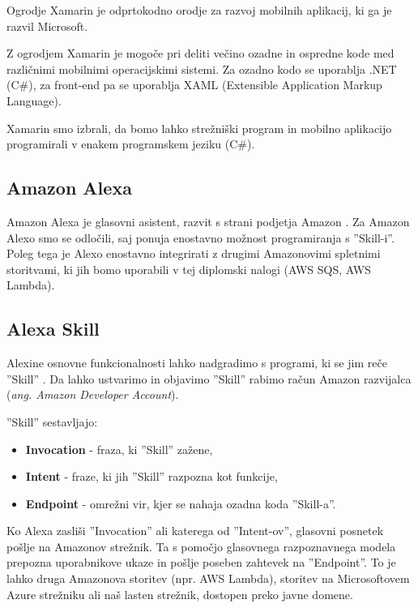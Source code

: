 \documentclass[a4paper, 12pt]{book}
\begin{document}
Ogrodje Xamarin \cite{xamarin} je odprtokodno orodje za razvoj mobilnih aplikacij, ki ga je razvil Microsoft. 

Z ogrodjem Xamarin je mogoče pri deliti večino ozadne in ospredne kode med različnimi mobilnimi operacijskimi sistemi. 
Za ozadno kodo se uporablja .NET (C\#), za front-end pa se uporablja XAML (Extensible Application Markup Language).

Xamarin smo izbrali, da bomo lahko strežniški program in mobilno aplikacijo programirali v enakem programskem jeziku (C\#).

\subsection{Amazon Alexa}

Amazon Alexa je glasovni asistent, razvit s strani podjetja Amazon \cite{alexa}.
Za Amazon Alexo smo se odločili, saj ponuja enostavno možnost programiranja s ''Skill-i''.
Poleg tega je Alexo enostavno integrirati z drugimi Amazonovimi spletnimi storitvami, ki jih bomo uporabili v tej diplomski nalogi (AWS SQS, AWS Lambda).

\subsection{Alexa Skill}

Alexine osnovne funkcionalnosti lahko nadgradimo s programi, ki se jim reče ''Skill'' \cite{alexaskills}.
Da lahko ustvarimo in objavimo ''Skill'' rabimo račun Amazon razvijalca (\textit{ang. Amazon Developer Account}).


\noindent ''Skill'' sestavljajo:
\begin{itemize}
	\item \textbf{Invocation} - fraza, ki ''Skill'' zažene,
	\item \textbf{Intent} - fraze, ki jih ''Skill'' razpozna kot funkcije,
	\item \textbf{Endpoint} - omrežni vir, kjer se nahaja ozadna koda ''Skill-a''.
\end{itemize}

Ko Alexa zasliši ''Invocation'' ali katerega od ''Intent-ov'', glasovni posnetek pošlje na Amazonov strežnik.
Ta s pomočjo glasovnega razpoznavnega modela prepozna uporabnikove ukaze in pošlje poseben zahtevek na ''Endpoint''.
To je lahko druga Amazonova storitev (npr. AWS Lambda), storitev na Microsoftovem Azure strežniku ali naš lasten strežnik, dostopen preko javne domene.
\end{document}
